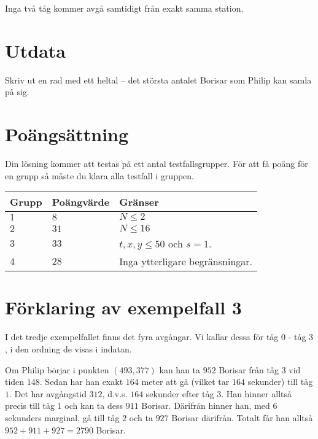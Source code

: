 Inga två tåg kommer avgå samtidigt från exakt samma station.

\section*{Utdata}
Skriv ut en rad med ett heltal -- det största antalet Borisar som Philip kan samla på sig.

\section*{Poängsättning}
Din lösning kommer att testas på ett antal testfallsgrupper.
För att få poäng för en grupp så måste du klara alla testfall i gruppen.

\noindent
\begin{tabular}{| l | l | l |}
  \hline
  Grupp & Poängvärde & Gränser \\ \hline
  $1$   & $8$        & $N \le 2$ \\ \hline
  $2$   & $31$       & $N \le 16$ \\ \hline
  $3$   & $33$       & $t,x,y\le 50$ och $s = 1$. \\ \hline
  $4$   & $28$       & Inga ytterligare begränsningar. \\ \hline
\end{tabular}

\section*{Förklaring av exempelfall 3}
I det tredje exempelfallet finns det fyra avgångar.
Vi kallar dessa för tåg $0$ - tåg $3$, i den ordning de visas i indatan.

Om Philip börjar i punkten $(493,377)$ kan han ta $952$ Borisar från tåg $3$ vid tiden $148$. Sedan har han exakt $164$ meter att gå (vilket tar $164$ sekunder) till tåg $1$. Det har avgångstid $312$, d.v.s. $164$ sekunder efter tåg $3$. 
Han hinner alltså precis till tåg $1$ och kan ta dess $911$ Borisar. Därifrån hinner han, med $6$ sekunders marginal, gå till tåg $2$ och ta $927$ Borisar därifrån. Totalt får han alltså $952+911+927=2790$ Borisar. 
